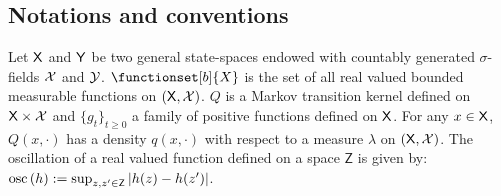 \subsection*{Notations and conventions}
Let $\mathsf{X}$ and $\mathsf{Y}$ be two general state-spaces endowed with countably generated $\sigma$-fields $\mathcal{X}$ and $\mathcal{Y}$. $\functionset[b]{X}$ is the set of all real valued bounded measurable functions on $(\mathsf{X},\mathcal{X})$. $Q$ is a Markov transition kernel defined on $\mathsf{X}\times\mathcal{X}$ and $\{g_{t}\}_{t\geq 0}$ a family of positive functions defined on $\mathsf{X}$. For any $x \in \mathsf{X}$, $Q(x,\cdot)$ has a density $q(x, \cdot)$ with respect to a measure $\lambda$ on $(\mathsf{X},\mathcal{X})$.  The oscillation of a real valued function defined on a space $\mathsf{Z}$ is given by:
$\oscnorm{h} \eqdef \sup_{z,z'\in\mathsf{Z}}\left|h(z)-h(z')\right|$.
